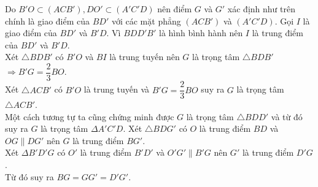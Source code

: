 \begin{ex}
{\begin{itemchoice}
			Do $B'O\subset \left(ACB'\right),DO'\subset \left(A'C'D\right)$ nên điểm $G$ và $G'$ xác định như trên chính là  giao điểm của $BD'$ với các mặt phẳng $\left(ACB'\right)$ và $\left(A'C'D\right)$.
			\itemch Gọi $I$ là giao điểm của $BD'$  và $B'D$. Vì $BDD'B'$ là hình bình hành nên $I$ là trung điểm của $BD'$ và $B'D$.\\
			Xét $\triangle BDB'$ có $B'O$ và $BI$ là trung tuyến nên $G$ là trọng tâm $\triangle BDB'$  $\Rightarrow B'G=\dfrac{2}{3} BO$.\\
			Xét $\triangle ACB'$ có $B'O$ là trung tuyến và $B'G=\dfrac{2}{3} BO$ suy ra $G$ là trọng  tâm $\triangle ACB'$.\\
			Một cách tương tự ta cũng chứng minh  được $G$ là trọng tâm $\triangle BDD'$ và từ đó suy ra $G$ là trọng tâm $\Delta A'C'D$.
			\itemch Xét $\triangle BDG'$ có $O$ là trung điểm $BD$  và $OG \parallel DG'$ nên $G$ là trung điểm $BG'$.\\
			Xét $\Delta B'D'G$ có $O'$ là trung điểm $B'D'$ và $O'G' \parallel B'G$ nên $G'$ là  trung điểm $D'G$.\\
			Từ  đó suy ra $BG=GG'=D'G'$.
		\end{itemchoice}
	 }
\end{ex}



